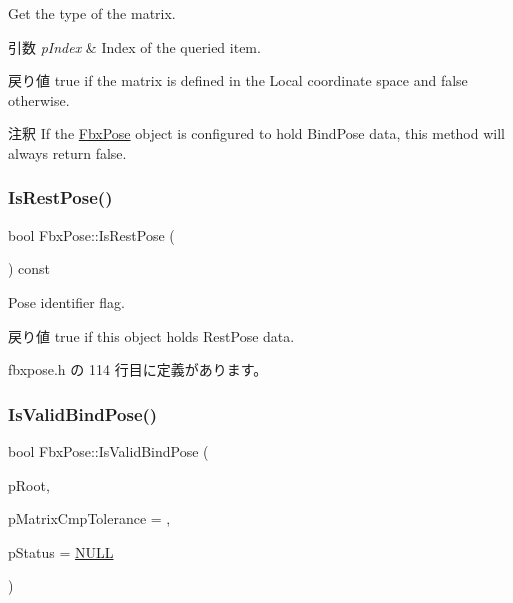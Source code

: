 Get the type of the matrix. 
\begin{DoxyParams}{引数}
{\em p\+Index} & Index of the queried item. \\
\hline
\end{DoxyParams}
\begin{DoxyReturn}{戻り値}
{\ttfamily true} if the matrix is defined in the Local coordinate space and false otherwise. 
\end{DoxyReturn}
\begin{DoxyRemark}{注釈}
If the \hyperlink{class_fbx_pose}{Fbx\+Pose} object is configured to hold Bind\+Pose data, this method will always return {\ttfamily false}. 
\end{DoxyRemark}
\mbox{\label{class_fbx_pose_a4c5f2afbe45d2a5cf0725c3cdff90dcf}} 
\subsubsection{\texorpdfstring{Is\+Rest\+Pose()}{IsRestPose()}}
{\footnotesize\ttfamily bool Fbx\+Pose\+::\+Is\+Rest\+Pose (\begin{DoxyParamCaption}{ }\end{DoxyParamCaption}) const\hspace{0.3cm}{\ttfamily [inline]}}

Pose identifier flag. \begin{DoxyReturn}{戻り値}
{\ttfamily true} if this object holds Rest\+Pose data. 
\end{DoxyReturn}


 fbxpose.\+h の 114 行目に定義があります。

\mbox{\label{class_fbx_pose_ac5e304f440e64f4152aac437ab8fbddc}} 
\subsubsection{\texorpdfstring{Is\+Valid\+Bind\+Pose()}{IsValidBindPose()}}
{\footnotesize\ttfamily bool Fbx\+Pose\+::\+Is\+Valid\+Bind\+Pose (\begin{DoxyParamCaption}\item[{\hyperlink{class_fbx_node}{Fbx\+Node} $\ast$}]{p\+Root,  }\item[{double}]{p\+Matrix\+Cmp\+Tolerance = {},  }\item[{\hyperlink{class_fbx_status}{Fbx\+Status} $\ast$}]{p\+Status = {\ttfamily \hyperlink{fbxarch_8h_a070d2ce7b6bb7e5c05602aa8c308d0c4}{N\+U\+LL}} }\end{DoxyParamCaption})}

